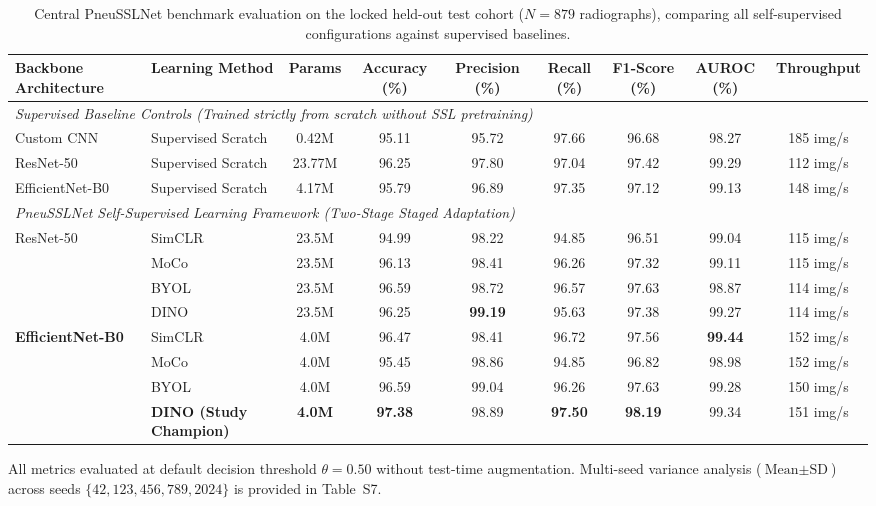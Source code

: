 \documentclass[journal,article,submit,moreauthors,pdftex]{Definitions/tsp}
\begin{document}
\begin{table}[t]
\tablesize{\scriptsize}
\centering
\caption{Central PneuSSLNet benchmark evaluation on the locked held-out test cohort ($N=879$ radiographs), comparing all self-supervised configurations against supervised baselines.}
\label{tab:main_benchmark}
\begin{threeparttable}
\begin{adjustbox}{max width=\textwidth}
\begin{tabular}{l l c c c c c c c}
\toprule
\textbf{Backbone Architecture} & \textbf{Learning Method} & \textbf{Params} & \textbf{Accuracy (\%)} & \textbf{Precision (\%)} & \textbf{Recall (\%)} & \textbf{F1-Score (\%)} & \textbf{AUROC (\%)} & \textbf{Throughput} \\
\midrule
\multicolumn{9}{l}{\emph{Supervised Baseline Controls (Trained strictly from scratch without SSL pretraining)}} \\
Custom CNN & Supervised Scratch & 0.42M & 95.11 & 95.72 & 97.66 & 96.68 & 98.27 & 185 img/s \\
ResNet-50 & Supervised Scratch & 23.77M & 96.25 & 97.80 & 97.04 & 97.42 & 99.29 & 112 img/s \\
EfficientNet-B0 & Supervised Scratch & 4.17M & 95.79 & 96.89 & 97.35 & 97.12 & 99.13 & 148 img/s \\
\midrule
\multicolumn{9}{l}{\emph{PneuSSLNet Self-Supervised Learning Framework (Two-Stage Staged Adaptation)}} \\
\multirow{4}{*}{ResNet-50} 
& SimCLR & 23.5M & 94.99 & 98.22 & 94.85 & 96.51 & 99.04 & 115 img/s \\
& MoCo & 23.5M & 96.13 & 98.41 & 96.26 & 97.32 & 99.11 & 115 img/s \\
& BYOL & 23.5M & 96.59 & 98.72 & 96.57 & 97.63 & 98.87 & 114 img/s \\
& DINO & 23.5M & 96.25 & \textbf{99.19} & 95.63 & 97.38 & 99.27 & 114 img/s \\
\midrule
\multirow{4}{*}{\textbf{EfficientNet-B0}} 
& SimCLR & 4.0M & 96.47 & 98.41 & 96.72 & 97.56 & \textbf{99.44} & 152 img/s \\
& MoCo & 4.0M & 95.45 & 98.86 & 94.85 & 96.82 & 98.98 & 152 img/s \\
& BYOL & 4.0M & 96.59 & 99.04 & 96.26 & 97.63 & 99.28 & 150 img/s \\
& \textbf{DINO (Study Champion)} & \textbf{4.0M} & \textbf{97.38} & 98.89 & \textbf{97.50} & \textbf{98.19} & 99.34 & 151 img/s \\
\bottomrule
\end{tabular}
\end{adjustbox}
\begin{tablenotes}
\item All metrics evaluated at default decision threshold $\theta = 0.50$ without test-time augmentation. Multi-seed variance analysis ($\text{Mean} \pm \text{SD}$) across seeds $\{42, 123, 456, 789, 2024\}$ is provided in Table~S7.
\end{tablenotes}
\end{threeparttable}
\end{table}
\end{document}

